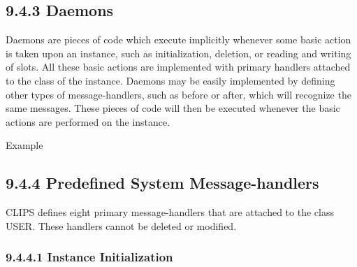 \documentclass[letterpaper,10pt,english]{sphinxmanual}
\begin{document}
\subsection{9.4.3 Daemons}
\label{\detokenize{cool:daemons}}
Daemons are pieces of code which execute implicitly whenever some basic
action is taken upon an instance, such as initialization, deletion, or
reading and writing of slots. All these basic actions are implemented
with primary handlers attached to the class of the instance. Daemons may
be easily implemented by defining other types of message-handlers, such
as before or after, which will recognize the same messages. These pieces
of code will then be executed whenever the basic actions are performed
on the instance.

Example

\begin{sphinxVerbatim}[commandchars=\\\{\}]
 
    
    
    
    
      
\PYG{p}{[}\PYG{p}{]}
\end{sphinxVerbatim}


\subsection{9.4.4 Predefined System Message-handlers}
\label{\detokenize{cool:predefined-system-message-handlers}}
CLIPS defines eight primary message-handlers that are attached to the
class USER. These handlers cannot be deleted or modified.


\subsubsection{9.4.4.1 Instance Initialization}
\label{\detokenize{cool:instance-initialization}}
\end{document}
